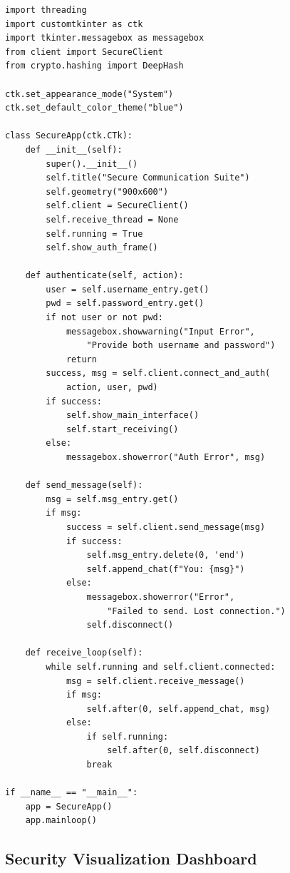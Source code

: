 \documentclass[12pt,a4paper]{article}
\begin{document}
\begin{lstlisting}[caption={GUI Application – \texttt{gui.py} (excerpt)}]
import threading
import customtkinter as ctk
import tkinter.messagebox as messagebox
from client import SecureClient
from crypto.hashing import DeepHash

ctk.set_appearance_mode("System")
ctk.set_default_color_theme("blue")

class SecureApp(ctk.CTk):
    def __init__(self):
        super().__init__()
        self.title("Secure Communication Suite")
        self.geometry("900x600")
        self.client = SecureClient()
        self.receive_thread = None
        self.running = True
        self.show_auth_frame()

    def authenticate(self, action):
        user = self.username_entry.get()
        pwd = self.password_entry.get()
        if not user or not pwd:
            messagebox.showwarning("Input Error",
                "Provide both username and password")
            return
        success, msg = self.client.connect_and_auth(
            action, user, pwd)
        if success:
            self.show_main_interface()
            self.start_receiving()
        else:
            messagebox.showerror("Auth Error", msg)

    def send_message(self):
        msg = self.msg_entry.get()
        if msg:
            success = self.client.send_message(msg)
            if success:
                self.msg_entry.delete(0, 'end')
                self.append_chat(f"You: {msg}")
            else:
                messagebox.showerror("Error",
                    "Failed to send. Lost connection.")
                self.disconnect()

    def receive_loop(self):
        while self.running and self.client.connected:
            msg = self.client.receive_message()
            if msg:
                self.after(0, self.append_chat, msg)
            else:
                if self.running:
                    self.after(0, self.disconnect)
                break

if __name__ == "__main__":
    app = SecureApp()
    app.mainloop()
\end{lstlisting}

\subsection{Security Visualization Dashboard}
\label{sec:dashboard}
\end{document}
